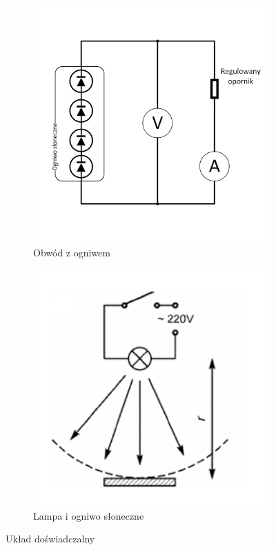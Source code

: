 \documentclass[12pt,a4paper]{article}
\begin{document}
\begin{figure}[H]
\centering
\begin{subfigure}{.5\textwidth}
  \centering
  \includegraphics[width=1\textwidth]{img_fiz/Circuit}
  \caption{Obwód z ogniwem}
  \label{fig:sub1}
\end{subfigure}
\begin{subfigure}{.5\textwidth}
  \centering
  \includegraphics[width=1\textwidth]{img_fiz/Lamp}
  \caption{Lampa i ogniwo słoneczne}
  \label{fig:sub2}
\end{subfigure}
\caption{Układ doświadczalny}
\label{fig:test}
\end{figure}
\end{document}
